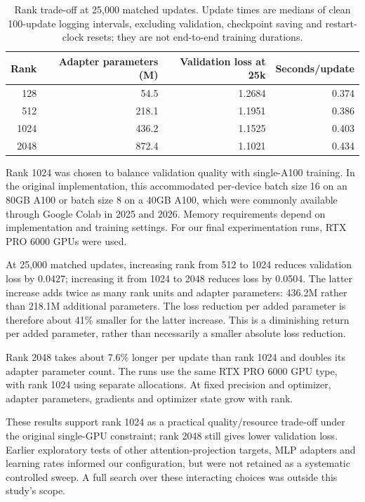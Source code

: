 \documentclass{article}
\begin{document}
\begin{table}[ht]
\caption{Rank trade-off at 25,000 matched updates. Update times are medians of clean 100-update logging intervals, excluding validation, checkpoint saving and restart-clock resets; they are not end-to-end training durations.}
\label{tab:rank-tradeoff}
\centering
\small
\begin{tabular}{rrrr}
\toprule
Rank & Adapter parameters (M) & Validation loss at 25k & Seconds/update \\
\midrule
128 & 54.5 & 1.2684 & 0.374 \\
512 & 218.1 & 1.1951 & 0.386 \\
1024 & 436.2 & 1.1525 & 0.403 \\
2048 & 872.4 & 1.1021 & 0.434 \\
\bottomrule
\end{tabular}
\end{table}

Rank 1024 was chosen to balance validation quality with single-A100 training. In the original implementation, this accommodated per-device batch size 16 on an 80GB A100 or batch size 8 on a 40GB A100, which were commonly available through Google Colab in 2025 and 2026. Memory requirements depend on implementation and training settings. For our final experimentation runs, RTX PRO 6000 GPUs were used.

At 25,000 matched updates, increasing rank from 512 to 1024 reduces validation loss by 0.0427; increasing it from 1024 to 2048 reduces loss by 0.0504. The latter increase adds twice as many rank units and adapter parameters: 436.2M rather than 218.1M additional parameters. The loss reduction per added parameter is therefore about 41\% smaller for the latter increase. This is a diminishing return per added parameter, rather than necessarily a smaller absolute loss reduction.

Rank 2048 takes about 7.6\% longer per update than rank 1024 and doubles its adapter parameter count. The runs use the same RTX PRO 6000 GPU type, with rank 1024 using separate allocations. At fixed precision and optimizer, adapter parameters, gradients and optimizer state grow with rank.

These results support rank 1024 as a practical quality/resource trade-off under the original single-GPU constraint; rank 2048 still gives lower validation loss. Earlier exploratory tests of other attention-projection targets, MLP adapters and learning rates informed our configuration, but were not retained as a systematic controlled sweep. A full search over these interacting choices was outside this study's scope.
\end{document}
